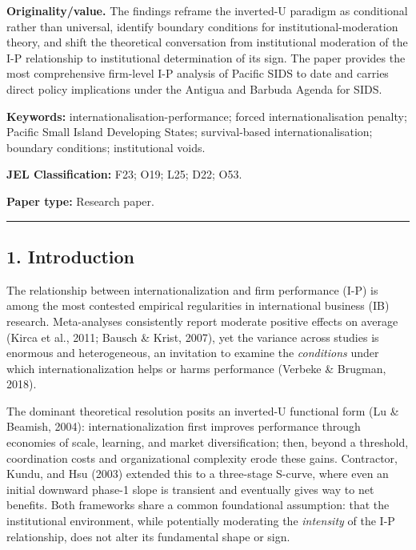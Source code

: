 \documentclass[12pt,a4paper]{article}
\begin{document}
\textbf{Originality/value.} The findings reframe the inverted-U paradigm
as conditional rather than universal, identify boundary conditions for
institutional-moderation theory, and shift the theoretical conversation
from institutional moderation of the I-P relationship to institutional
determination of its sign. The paper provides the most comprehensive
firm-level I-P analysis of Pacific SIDS to date and carries direct
policy implications under the Antigua and Barbuda Agenda for SIDS.

\textbf{Keywords:} internationalisation-performance; forced
internationalisation penalty; Pacific Small Island Developing States;
survival-based internationalisation; boundary conditions; institutional
voids.

\textbf{JEL Classification:} F23; O19; L25; D22; O53.

\textbf{Paper type:} Research paper.

\begin{center}\rule{0.5\linewidth}{0.5pt}\end{center}

\hypertarget{1-introduction}{%
\subsection{1. Introduction}\label{1-introduction}}

The relationship between internationalization and firm performance (I-P)
is among the most contested empirical regularities in international
business (IB) research. Meta-analyses consistently report moderate
positive effects on average (Kirca et al., 2011; Bausch \& Krist, 2007),
yet the variance across studies is enormous and heterogeneous, an
invitation to examine the \emph{conditions} under which
internationalization helps or harms performance (Verbeke \& Brugman,
2018).

The dominant theoretical resolution posits an inverted-U functional form
(Lu \& Beamish, 2004): internationalization first improves performance
through economies of scale, learning, and market diversification; then,
beyond a threshold, coordination costs and organizational complexity
erode these gains. Contractor, Kundu, and Hsu (2003) extended this to a
three-stage S-curve, where even an initial downward phase-1 slope is
transient and eventually gives way to net benefits. Both frameworks
share a common foundational assumption: that the institutional
environment, while potentially moderating the \emph{intensity} of the
I-P relationship, does not alter its fundamental shape or sign.
\end{document}
